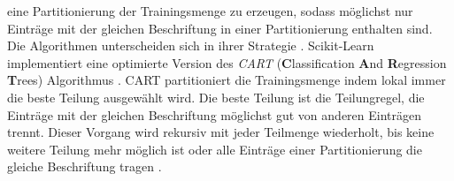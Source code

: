 eine Partitionierung der Trainingsmenge zu erzeugen, sodass möglichst nur Einträge mit der gleichen Beschriftung in einer Partitionierung enthalten sind. Die Algorithmen unterscheiden
sich in ihrer Strategie \cite{quinlan1986induction}.
\newline
\newline
Scikit-Learn implementiert eine optimierte Version des \textit{CART} (\textbf{C}lassification \textbf{A}nd \textbf{R}egression \textbf{T}rees) Algorithmus \cite{ScikitLearnCART}.
CART partitioniert die Trainingsmenge indem lokal immer die beste Teilung ausgewählt wird.
Die beste Teilung ist die Teilungregel, die Einträge mit der gleichen Beschriftung möglichst gut von anderen Einträgen trennt.
Dieser Vorgang wird rekursiv mit jeder Teilmenge wiederholt, bis keine weitere Teilung mehr möglich ist oder alle Einträge einer Partitionierung die gleiche Beschriftung tragen \cite{steinbergCART}.